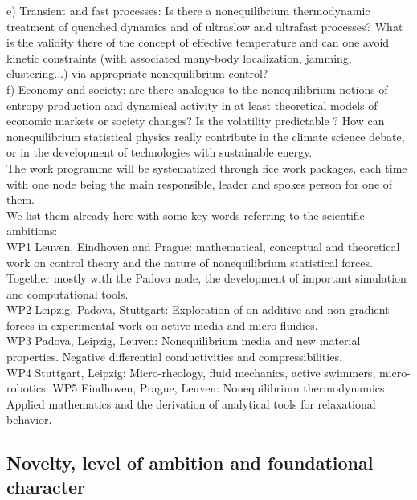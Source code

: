 e) Transient and fast processes: Is there a nonequilibrium thermodynamic treatment of quenched dynamics and of ultraslow and ultrafast processes?  What is the validity there of the concept of effective temperature and can one avoid kinetic constraints (with associated many-body localization, jamming, clustering...) via appropriate nonequilibrium control?\\
f) Economy and society: are there analogues to the nonequilibrium notions of entropy production and dynamical activity in at least theoretical models of economic markets or society changes?  Is the volatility predictable ?  How can nonequilibrium statistical physics really contribute in the climate science debate, or in the development of technologies with  sustainable energy.\\

The work programme will be systematized through fice work packages, each time with one node being the main responsible, leader and spokes person for one of them.\\
We list them already here with some key-words referring to the scientific ambitions:\\
WP1 Leuven, Eindhoven and Prague: mathematical, conceptual and theoretical work on control theory and the nature of nonequilibrium statistical forces.  Together mostly with the Padova node, the development of important simulation anc computational tools.\\
WP2 Leipzig, Padova, Stuttgart:  Exploration of on-additive and non-gradient forces in experimental work on active media and micro-fluidics.\\
WP3 Padova, Leipzig, Leuven: Nonequilibrium media and new material properties.   Negative differential conductivities and compressibilities.\\
WP4 Stuttgart, Leipzig: Micro-rheology, fluid mechanics, active swimmers, micro-robotics.
WP5 Eindhoven, Prague, Leuven: Nonequilibrium thermodynamics.  Applied mathematics and the derivation of analytical tools for relaxational behavior.\\



\subsection{Novelty, level of ambition and foundational character}\label{sec:progress}


